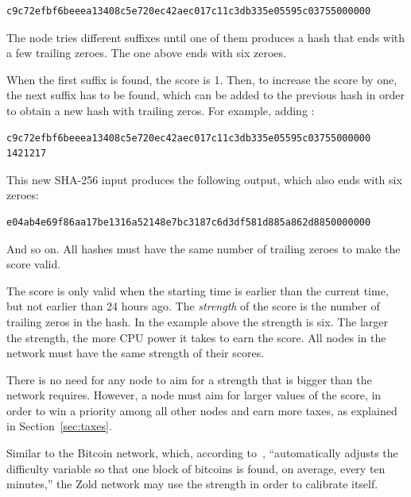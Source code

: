 \documentclass{main}
\begin{document}
\begin{verbatim}
c9c72efbf6beeea13408c5e720ec42aec017c11c3db335e05595c03755000000
\end{verbatim}

The node tries different suffixes until one of them produces
a hash that ends with a few trailing zeroes. The one above ends
with six zeroes.

When the first suffix is found, the score is 1. Then, to
increase the score by one, the next suffix has to be found, which
can be added to the previous hash
in order to obtain a new hash with trailing zeros. For example,
adding :

\begin{verbatim}
c9c72efbf6beeea13408c5e720ec42aec017c11c3db335e05595c03755000000 1421217
\end{verbatim}

This new SHA-256 input produces the following output, which also
ends with six zeroes:

\begin{verbatim}
e04ab4e69f86aa17be1316a52148e7bc3187c6d3df581d885a862d8850000000
\end{verbatim}

And so on. All hashes must have the same number of trailing zeroes to make
the score valid.

The score is only valid when the starting time is earlier than
the current time, but not earlier than 24 hours ago. The \emph{strength} of the score
is the number of trailing zeros in the hash. In the example above the
strength is six. The larger the strength, the more CPU power it takes to earn
the score. All nodes in the network must have the same strength of their scores.

There is no need for any node to aim for a strength that is bigger than the network requires.
However, a node must aim for larger values of the score, in order
to win a priority among all other nodes and earn more taxes,
as explained in Section~\ref{sec:taxes}.

Similar to the Bitcoin network, which, according to~\textcite{hayes2017},
``automatically adjusts the difficulty
variable so that one block of bitcoins is found, on average, every ten minutes,''
the Zold network may use the strength in order to calibrate itself.

\end{document}
